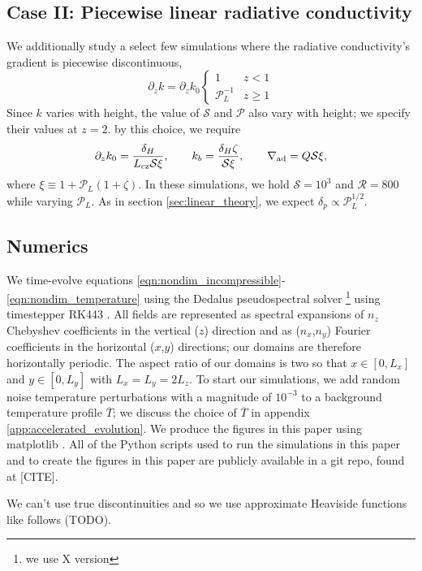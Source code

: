 \documentclass{aastex631}
\newcommand{\gradad}{\ensuremath{\nabla_{\rm{ad}}}}
\newcommand{\mP}{\ensuremath{\mathcal{P}}}
\newcommand{\Lcz}{\ensuremath{L_{\rm{cz}}}}
\newcommand{\mR}{\ensuremath{\mathcal{R}}}
\newcommand{\mS}{\ensuremath{\mathcal{S}}}
\begin{document}
\subsection{Case II: Piecewise linear radiative conductivity}
We additionally study a select few simulations where the radiative conductivity's gradient is piecewise discontinuous,
\begin{equation}
\partial_z k = \partial_z k_0
\begin{cases}
1	&	z < 1 \\
\mP_L^{-1} &	z \geq 1
\end{cases}
\end{equation}
Since $k$ varies with height, the value of $\mS$ and $\mP$ also vary with height; we specify their values at $z = 2$.
by this choice, we require
\begin{equation}
\partial_z k_0 = \frac{\delta_H}{\Lcz \mS \xi},\qquad
k_b = \frac{\delta_H\zeta}{\mS\xi},\qquad
\gradad = Q \mS \xi,
\end{equation}
where $\xi \equiv 1 + \mP_L(1 + \zeta)$.
In these simulations, we hold $\mS = 10^3$ and $\mR = 800$ while varying $\mP_L$.
As in section \ref{sec:linear_theory}, we expect $\delta_p \propto \mP_L^{1/2}$.

\subsection{Numerics}
We time-evolve equations \ref{eqn:nondim_incompressible}-\ref{eqn:nondim_temperature} using the Dedalus pseudospectral solver \citep{burns_etal_2020}\footnote{we use X version} using timestepper RK443 \citep{ascher_etal_1997}.
All fields are represented as spectral expansions of $n_z$ Chebyshev coefficients in the vertical ($z$) direction and as ($n_x$,$n_y$) Fourier coefficients in the horizontal ($x$,$y$) directions; our domains are therefore horizontally periodic.
The aspect ratio of our domains is two so that $x \in [0, L_x]$ and $y \in [0, L_y]$ with $L_x = L_y = 2 L_z$.
To start our simulations, we add random noise temperature perturbations with a magnitude of $10^{-3}$ to a background temperature profile $\overline{T}$; we discuss the choice of $\overline{T}$ in appendix \ref{app:accelerated_evolution}.
We produce the figures in this paper using matplotlib \citep{hunter2007, mpl3.3.4}.
All of the Python scripts used to run the simulations in this paper and to create the figures in this paper are publicly available in a git repo, found at [CITE].

We can't use true discontinuities and so we use approximate Heaviside functions like follows (TODO).
\end{document}

